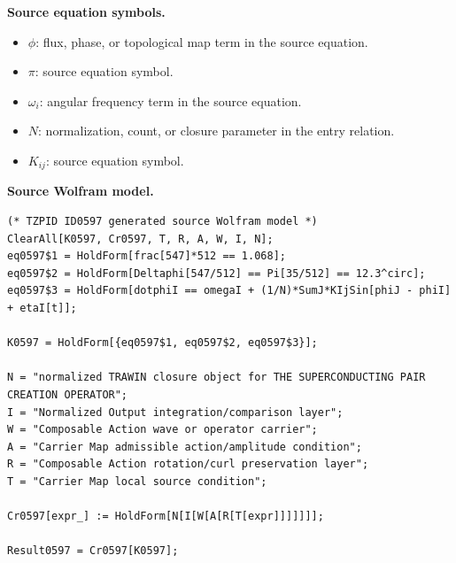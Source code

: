 \begin{minipage}[t]{0.49\linewidth}
\begingroup
\small
\raggedright
\textbf{Source equation symbols.}\par
\begin{itemize}[leftmargin=1.35em,itemsep=1pt,topsep=1pt,parsep=0pt]
    \item $\phi$: flux, phase, or topological map term in the source equation.
    \item $\pi$: source equation symbol.
    \item $\omega_i$: angular frequency term in the source equation.
    \item $N$: normalization, count, or closure parameter in the entry relation.
    \item $K_{ij}$: source equation symbol.
\end{itemize}
\endgroup
\end{minipage}\hfill
\begin{minipage}[t]{0.47\linewidth}
\begingroup
\scriptsize
\raggedright
\textbf{Source Wolfram model.}\par
\begin{Verbatim}[fontsize=\tiny,breaklines=true,breakanywhere=true]
(* TZPID ID0597 generated source Wolfram model *)
ClearAll[K0597, Cr0597, T, R, A, W, I, N];
eq0597$1 = HoldForm[frac[547]*512 == 1.068];
eq0597$2 = HoldForm[Deltaphi[547/512] == Pi[35/512] == 12.3^circ];
eq0597$3 = HoldForm[dotphiI == omegaI + (1/N)*SumJ*KIjSin[phiJ - phiI] + etaI[t]];

K0597 = HoldForm[{eq0597$1, eq0597$2, eq0597$3}];

N = "normalized TRAWIN closure object for THE SUPERCONDUCTING PAIR CREATION OPERATOR";
I = "Normalized Output integration/comparison layer";
W = "Composable Action wave or operator carrier";
A = "Carrier Map admissible action/amplitude condition";
R = "Composable Action rotation/curl preservation layer";
T = "Carrier Map local source condition";

Cr0597[expr_] := HoldForm[N[I[W[A[R[T[expr]]]]]]];

Result0597 = Cr0597[K0597];
\end{Verbatim}
\endgroup
\end{minipage}

